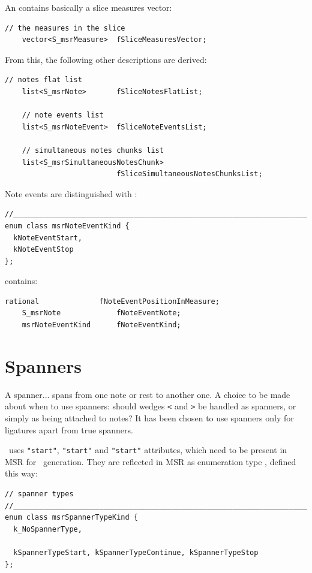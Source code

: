 An  contains basically a slice measures vector:
\begin{lstlisting}[language=CPlusPlus]
    // the measures in the slice
    vector<S_msrMeasure>  fSliceMeasuresVector;
\end{lstlisting}

From this, the following other descriptions are derived:
\begin{lstlisting}[language=CPlusPlus]
    // notes flat list
    list<S_msrNote>       fSliceNotesFlatList;

    // note events list
    list<S_msrNoteEvent>  fSliceNoteEventsList;

    // simultaneous notes chunks list
    list<S_msrSimultaneousNotesChunk>
                          fSliceSimultaneousNotesChunksList;
\end{lstlisting}

Note events are distinguished with :
\begin{lstlisting}[language=CPlusPlus]
//________________________________________________________________________
enum class msrNoteEventKind {
  kNoteEventStart,
  kNoteEventStop
};
\end{lstlisting}

 contains:
\begin{lstlisting}[language=CPlusPlus]
    rational              fNoteEventPositionInMeasure;
    S_msrNote             fNoteEventNote;
    msrNoteEventKind      fNoteEventKind;

\end{lstlisting}



\section{Spanners}\label{Spanners}

A spanner... spans from one note or rest to another one. A choice to be made about when to use spanners: should
wedges {\tt <} and {\tt >} be handled as spanners, or simply as being attached to notes? It has been chosen to use spanners only for ligatures apart from true spanners.

\mxml\ uses {\tt "start"}, {\tt "start"} and {\tt "start"} attributes, which need to be present in MSR for \mxml\ generation. They are reflected in MSR as enumeration type , defined this way:
\begin{lstlisting}[language=CPlusPlus]
// spanner types
//______________________________________________________________________________
enum class msrSpannerTypeKind {
  k_NoSpannerType,

  kSpannerTypeStart, kSpannerTypeContinue, kSpannerTypeStop
};
\end{lstlisting}



